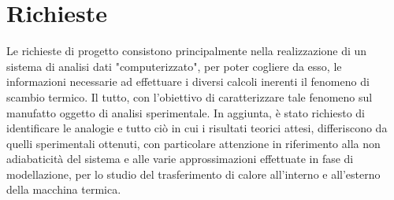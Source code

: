 \documentclass[a4paper,10pt]{article}                                                                                       %
\begin{document}
\tableofcontents                                                                                                            %
\vspace{1.5cm}                                                                                                              %
\listoftables                                                                                                               %
\vspace{1.5cm}                                                                                                              %
\listoffigures                                                                                                              %
\pagebreak                                                                                                                  %

\section{Richieste}                                                                                                         %
\label{sec:project_request}                                                                                                 %
  Le richieste di progetto consistono principalmente nella realizzazione di un sistema di analisi dati "computerizzato",
  per poter cogliere da esso, le informazioni necessarie ad effettuare i diversi calcoli inerenti il fenomeno di scambio
  termico. Il tutto, con l'obiettivo di caratterizzare tale fenomeno sul manufatto oggetto di analisi sperimentale. In
  aggiunta, è stato richiesto di identificare le analogie e tutto ciò in cui i risultati teorici attesi, differiscono da
  quelli sperimentali ottenuti, con particolare attenzione in riferimento alla non adiabaticità del sistema e alle varie
  approssimazioni effettuate in fase di modellazione, per lo studio del trasferimento di calore all'interno e all'esterno
  della macchina termica.
\end{document}
